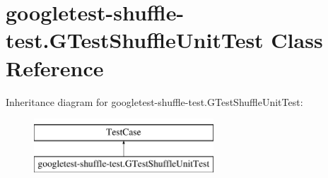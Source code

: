 \hypertarget{classgoogletest-shuffle-test_1_1GTestShuffleUnitTest}{}\section{googletest-\/shuffle-\/test.G\+Test\+Shuffle\+Unit\+Test Class Reference}
\label{classgoogletest-shuffle-test_1_1GTestShuffleUnitTest}
Inheritance diagram for googletest-\/shuffle-\/test.G\+Test\+Shuffle\+Unit\+Test\+:\begin{figure}[H]
\begin{center}
\leavevmode
\includegraphics[height=2.000000cm]{classgoogletest-shuffle-test_1_1GTestShuffleUnitTest}
\end{center}
\end{figure}
